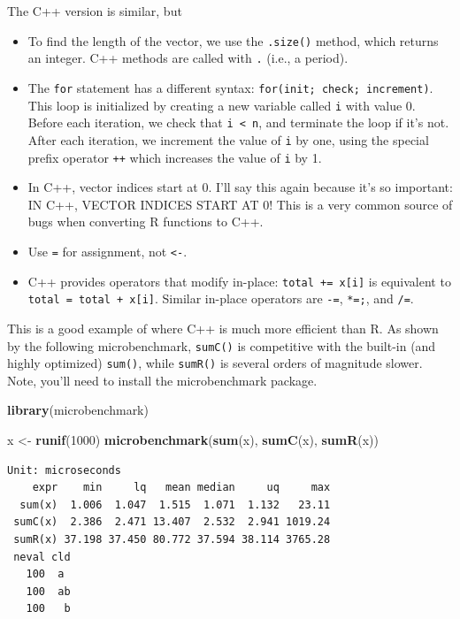\documentclass[
]{krantz}
\makeatletter
\newenvironment{Shaded}{\begin{snugshade}}{\end{snugshade}}
\newcommand{\DecValTok}[1]{\textcolor[rgb]{0.06,0.06,0.06}{#1}}
\newcommand{\KeywordTok}[1]{\textcolor[rgb]{0.27,0.27,0.27}{\textbf{#1}}}
\newcommand{\NormalTok}[1]{#1}
\newcommand{\StringTok}[1]{\textcolor[rgb]{0.5,0.5,0.5}{#1}}
\newenvironment{kframe}{%
\medskip{}
\setlength{\fboxsep}{.8em}
 \def\at@end@of@kframe{}%
 \ifinner\ifhmode%
  \def\at@end@of@kframe{\end{minipage}}%
  \begin{minipage}{\columnwidth}%
 \fi\fi%
 \def\FrameCommand##1{\hskip\@totalleftmargin \hskip-\fboxsep
 \colorbox{shadecolor}{##1}\hskip-\fboxsep
     \hskip-\linewidth \hskip-\@totalleftmargin \hskip\columnwidth}%
 \MakeFramed {\advance\hsize-\width
   \@totalleftmargin\z@ \linewidth\hsize
   \@setminipage}}%
 {\par\unskip\endMakeFramed%
 \at@end@of@kframe}
\renewenvironment{Shaded}{\begin{kframe}}{\end{kframe}}
\makeatother
\begin{document}
The C++ version is similar, but

\begin{itemize}
\item
  To find the length of the vector, we use the \texttt{.size()} method, which returns an integer. C++ methods are called with \texttt{.} (i.e., a period).
\item
  The \texttt{for} statement has a different syntax: \texttt{for(init;\ check;\ increment)}. This loop is initialized by creating a new variable called \texttt{i} with value 0. Before each iteration, we check that \texttt{i\ \textless{}\ n}, and terminate the loop if it's not. After each iteration, we increment the value of \texttt{i} by one, using the special prefix operator \texttt{++} which increases the value of \texttt{i} by 1.
\item
  In C++, vector indices start at 0. I'll say this again because it's so important: IN C++, VECTOR INDICES START AT 0! This is a very common source of bugs when converting R functions to C++.
\item
  Use \texttt{=} for assignment, not \texttt{\textless{}-}.
\item
  C++ provides operators that modify in-place: \texttt{total\ +=\ x{[}i{]}} is equivalent to \texttt{total\ =\ total\ +\ x{[}i{]}}. Similar in-place operators are \texttt{-=}, \texttt{*=;}, and \texttt{/=}.
\end{itemize}

This is a good example of where C++ is much more efficient than R. As shown by the following microbenchmark, \texttt{sumC()} is competitive with the built-in (and highly optimized) \texttt{sum()}, while \texttt{sumR()} is several orders of magnitude slower. Note, you'll need to install the microbenchmark package.

\begin{Shaded}
\begin{Highlighting}[]
\KeywordTok{library}\NormalTok{(microbenchmark)}

\NormalTok{x \textless{}{-}}\StringTok{ }\KeywordTok{runif}\NormalTok{(}\DecValTok{1000}\NormalTok{)}
\KeywordTok{microbenchmark}\NormalTok{(}\KeywordTok{sum}\NormalTok{(x), }\KeywordTok{sumC}\NormalTok{(x), }\KeywordTok{sumR}\NormalTok{(x))}
\end{Highlighting}
\end{Shaded}

\begin{verbatim}
Unit: microseconds
    expr    min     lq   mean median     uq     max
  sum(x)  1.006  1.047  1.515  1.071  1.132   23.11
 sumC(x)  2.386  2.471 13.407  2.532  2.941 1019.24
 sumR(x) 37.198 37.450 80.772 37.594 38.114 3765.28
 neval cld
   100  a 
   100  ab
   100   b
\end{verbatim}
\end{document}
